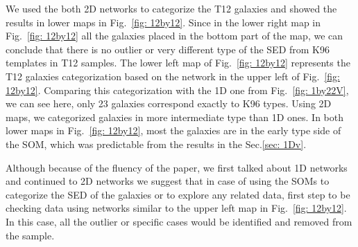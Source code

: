     We used the both 2D networks to categorize the T12 galaxies and showed the results in lower maps in Fig.~\ref{fig: 12by12}.
    Since in the lower right map in Fig.~\ref{fig: 12by12} all the galaxies placed in the bottom part of the map, we can conclude that there is no outlier or very different type of the SED from K96 templates in T12 samples.
    The lower left map of Fig.~\ref{fig: 12by12} represents the T12 galaxies categorization based on the network in the upper left of Fig.~\ref{fig: 12by12}. 
    Comparing this categorization with the 1D one from Fig.~\ref{fig: 1by22V}, we can see here, only 23 galaxies correspond exactly to K96 types.
    Using 2D maps, we categorized galaxies in more intermediate type than 1D ones.
    In both lower maps in Fig.~\ref{fig: 12by12}, most the galaxies are in the early type side of the SOM, which was predictable from the results in the Sec.\ref{sec: 1Dv}. %
    


    Although because of the fluency of the paper, we first talked about 1D networks and continued to 2D networks we suggest that in case of using the SOMs to categorize the SED of the galaxies or to explore any related data, first step to be checking data using networks similar to the upper left map in Fig.~\ref{fig: 12by12}.
    In this case, all the outlier or specific cases would be identified and removed from the sample. 

    
    
    